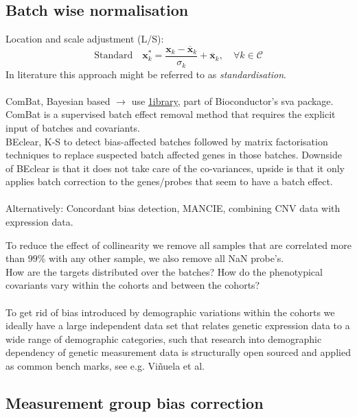 \documentclass[a4paper,10pt]{article}
\begin{document}
\subsection{Batch wise normalisation}
%
Location and scale adjustment (L/S):
\begin{equation}
\mbox{Standard}\quad \mathbf{x}^*_k= \frac{\mathbf{x}_k-\overline{\mathbf{x}}_k}{\sigma_k} + \overline{\mathbf{x}}_k,\quad \forall k\in \mathcal{C}
\end{equation}
%
In literature this approach might be referred to as \textit{standardisation}. \\ \\
%
ComBat, Bayesian based $\rightarrow$ use \href{http://www.bu.edu/jlab/wp-assets/ComBat/Abstract.html}{1ibrary}, part of Bioconductor's sva package. ComBat is a supervised batch effect removal method that requires the explicit input of batches and covariants.\\
%
BEclear, K-S to detect bias-affected batches followed by matrix factorisation techniques to replace suspected batch affected genes in those batches. Downside of BEclear is that it does not take care of the co-variances, upside is that
it only applies batch correction to the genes/probes that seem to have a batch effect. \\ \\ 

Alternatively: Concordant bias detection, MANCIE, combining CNV data with expression data.


To reduce the effect of collinearity we remove all samples that are correlated more than $99\%$ with 
any other sample, we also remove all NaN probe's. \\ 

%
How are the targets distributed over the batches? How do the phenotypical covariants vary within the 
cohorts and between the cohorts? \\ \\
%
To get rid of bias introduced by demographic variations within the cohorts we ideally have a large
independent data set that relates genetic expression data to a wide range of demographic categories, such that research into
demographic dependency of genetic measurement data is structurally open sourced and applied as common bench marks, see e.g. 
Vi\~{n}uela et al\cite{Vinuela2018}.
%
\subsection{Measurement group bias correction}
%
\end{document}
